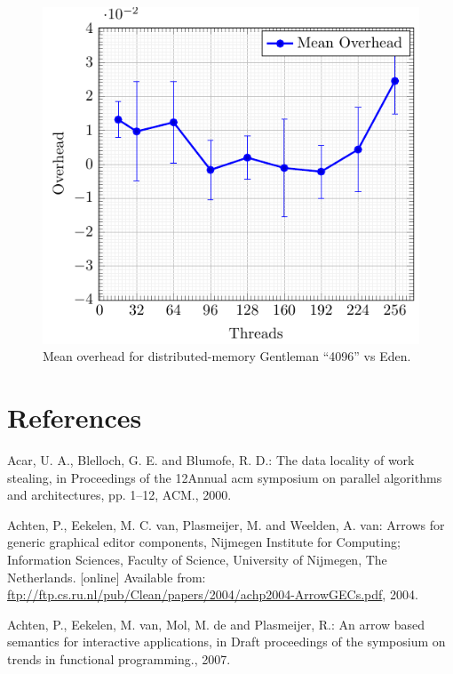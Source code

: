 \documentclass[paper=A4,twoside=true,openright,parskip=full,chapterprefix=true,headings=normal,bibliography=totoc,listof=totoc,titlepage=on,captions=tableabove,draft=false,british]{scrreprt}%
\renewcommand{\enquote}[1]{{``}#1{''}}
\begin{document}
\begin{figure}
\centering
\includegraphics{src/img/overDistTorusEden.pdf}
\caption{Mean overhead for distributed-memory Gentleman \enquote{4096}
vs Eden.\label{fig:overDistTorusEden}}
\end{figure}

\hypertarget{references}{%
\chapter*{References}\label{references}}

\hypertarget{refs}{}
\leavevmode\hypertarget{ref-Acar:2000:DLW:341800.341801}{}%
Acar, U. A., Blelloch, G. E. and Blumofe, R. D.: The data locality of
work stealing, in Proceedings of the 12Annual acm symposium on parallel
algorithms and architectures, pp. 1--12, ACM., 2000.

\leavevmode\hypertarget{ref-achten2004arrows}{}%
Achten, P., Eekelen, M. C. van, Plasmeijer, M. and Weelden, A. van:
Arrows for generic graphical editor components, Nijmegen Institute for
Computing; Information Sciences, Faculty of Science, University of
Nijmegen, The Netherlands. {[}online{]} Available from:
\url{ftp://ftp.cs.ru.nl/pub/Clean/papers/2004/achp2004-ArrowGECs.pdf},
2004.

\leavevmode\hypertarget{ref-achten2007arrow}{}%
Achten, P., Eekelen, M. van, Mol, M. de and Plasmeijer, R.: An arrow
based semantics for interactive applications, in Draft proceedings of
the symposium on trends in functional programming., 2007.
\end{document}
